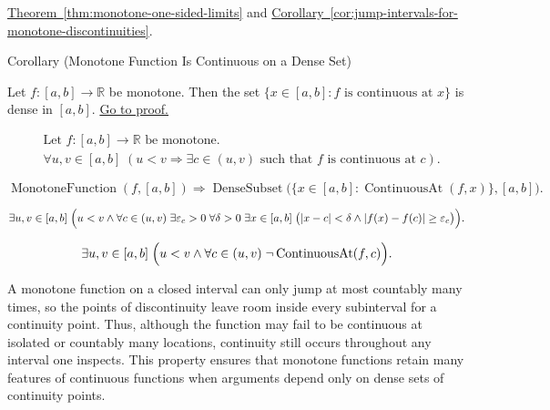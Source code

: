 \begin{remark*}[Dependencies]
\hyperref[thm:monotone-one-sided-limits]{Theorem~\ref{thm:monotone-one-sided-limits}} and \hyperref[cor:jump-intervals-for-monotone-discontinuities]{Corollary~\ref{cor:jump-intervals-for-monotone-discontinuities}}.
\end{remark*}

\begin{corollarybox}{Corollary (Monotone Function Is Continuous on a Dense Set)}
\begin{corollary}
\label{cor:monotone-continuous-on-dense-set}
Let $f:[a,b]\to\mathbb{R}$ be monotone. Then the set $\{x\in[a,b]:f \text{ is continuous at } x\}$ is dense in $[a,b]$.
\hyperref[prf:monotone-continuous-on-dense-set]{Go to proof.}
\end{corollary}
\end{corollarybox}

\begin{remark*}
\[
\begin{aligned}
&\text{Let } f:[a,b]\to\mathbb{R} \text{ be monotone.}\\
&\forall u,v\in[a,b] \; (u<v \Rightarrow \exists c\in(u,v)\text{ such that }f \text{ is continuous at } c).
\end{aligned}
\]
\end{remark*}

\begin{remark*}
\[
\operatorname{MonotoneFunction}(f,[a,b])
\Longrightarrow
\operatorname{DenseSubset}\bigl(\{x\in[a,b]:\operatorname{ContinuousAt}(f,x)\},[a,b]\bigr).
\]
\end{remark*}

\begin{remark*}
\[
\exists u,v\in[a,b]\;
\Bigl(u<v \land
\forall c\in(u,v)\;\exists \varepsilon_c>0\;\forall \delta>0\;\exists x\in[a,b]\;
\bigl(|x-c|<\delta\land |f(x)-f(c)|\ge\varepsilon_c\bigr)\Bigr).
\]
\end{remark*}

\begin{remark*}
\[
\exists u,v\in[a,b]\;
\Bigl(u<v \land
\forall c\in(u,v)\;\neg\operatorname{ContinuousAt}(f,c)\Bigr).
\]
\end{remark*}

\begin{remark*}[Interpretation]
A monotone function on a closed interval can only jump at most countably many times, so the points of discontinuity leave room inside every subinterval for a continuity point. Thus, although the function may fail to be continuous at isolated or countably many locations, continuity still occurs throughout any interval one inspects. This property ensures that monotone functions retain many features of continuous functions when arguments depend only on dense sets of continuity points.
\end{remark*}

